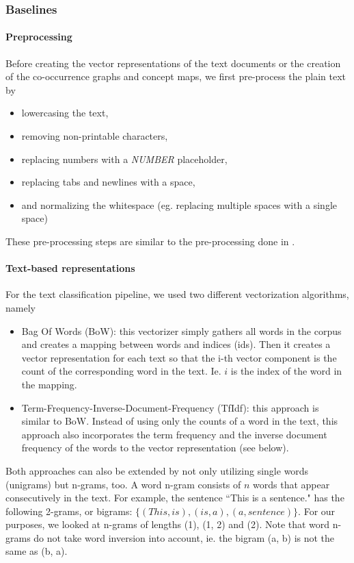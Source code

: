 \subsubsection{Baselines}
\paragraph{Preprocessing}
Before creating the vector representations of the text documents or the creation of the co-occurrence graphs and concept maps, we first pre-process the plain text by

\begin{itemize}
\item{lowercasing the text,}
\item{removing non-printable characters,}
\item{replacing numbers with a \textit{NUMBER} placeholder,}
\item{replacing tabs and newlines with a space,}
\item{and normalizing the whitespace (eg. replacing multiple spaces with a single space)}
\end{itemize}
These pre-processing steps are similar to the pre-processing done in \cite{Cachopo2007}.

\paragraph{Text-based representations}
For the text classification pipeline, we used two different vectorization algorithms, namely
\begin{itemize}
\item{Bag Of Words (BoW): this vectorizer simply gathers all words in the corpus and creates a mapping between words and indices (ids). Then it creates a vector representation for each text so that the i-th vector component  is the count of the corresponding word in the text. Ie. $i$ is the index of the word in the mapping.}
\item{Term-Frequency-Inverse-Document-Frequency (TfIdf): this approach is similar to BoW. Instead of using only the counts of a word in the text, this approach also incorporates the term frequency and the inverse document frequency of the words to the vector representation (see below).}
\end{itemize}
Both approaches can also be extended by not only utilizing single words (unigrams) but n-grams, too. A word n-gram consists of $n$ words that appear consecutively in the text.
For example, the sentence ``This is a sentence." has the following 2-grams, or bigrams: $\{ (This, is), (is, a), (a, sentence) \}$.
For our purposes, we looked at n-grams of lengths (1), (1, 2) and (2).
Note that word n-grams do not take word inversion into account, ie. the bigram (a, b) is not the same as (b, a).

